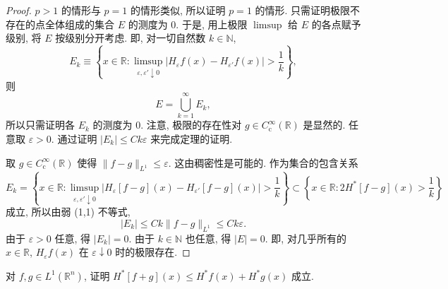 \begin{proof}
$p > 1$ 的情形与 $p = 1$ 的情形类似, 所以证明 $p = 1$ 的情形. 只需证明极限不存在的点全体组成的集合 $E$ 的测度为 $0$. 于是, 用上极限 $\limsup$ 给 $E$ 的各点赋予级别, 将 $E$ 按级别分开考虑. 即, 对一切自然数 $k \in \mathbb{N}$,
\[
E_{k} \equiv \left\{x \in \mathbb{R} : \limsup_{\varepsilon, \varepsilon' \downarrow 0}|H_{\varepsilon}f(x) - H_{\varepsilon'}f(x)| > \frac{1}{k}\right\},
\]
则
\[
E = \bigcup_{k=1}^{\infty}E_{k},
\]
所以只需证明各 $E_{k}$ 的测度为 $0$. 注意, 极限的存在性对 $g \in C_{\mathrm{c}}^{\infty}(\mathbb{R})$ 是显然的. 任意取 $\varepsilon > 0$. 通过证明 $|E_{k}| \leq Ck\varepsilon$ 来完成定理的证明.

取 $g \in C_{\mathrm{c}}^{\infty}(\mathbb{R})$ 使得 $\|f - g\|_{L^{1}} \leq \varepsilon$. 这由稠密性是可能的. 作为集合的包含关系
\begin{equation}\tag{4.40}
E_{k} = \left\{x \in \mathbb{R} : \limsup_{\varepsilon, \varepsilon' \downarrow 0}|H_{\varepsilon}[f-g](x) - H_{\varepsilon'}[f-g](x)| > \frac{1}{k}\right\} \subset \left\{x \in \mathbb{R} : 2H^{*}[f-g](x) > \frac{1}{k}\right\}
\label{eq:4.40}
\end{equation}
成立, 所以由弱 (1,1) 不等式,
\[
|E_{k}| \leq Ck\|f - g\|_{L^{1}} \leq Ck\varepsilon.
\]
由于 $\varepsilon > 0$ 任意, 得 $|E_{k}| = 0$. 由于 $k \in \mathbb{N}$ 也任意, 得 $|E| = 0$. 即, 对几乎所有的 $x \in \mathbb{R}$, $H_{\varepsilon}f(x)$ 在 $\varepsilon \downarrow 0$ 时的极限存在.
\end{proof}

\begin{exercise}\label{exer:4.12}
对 $f, g \in L^{1}(\mathbb{R}^{n})$, 证明 $H^{*}[f+g](x) \leq H^{*}f(x) + H^{*}g(x)$ 成立.
\end{exercise}
